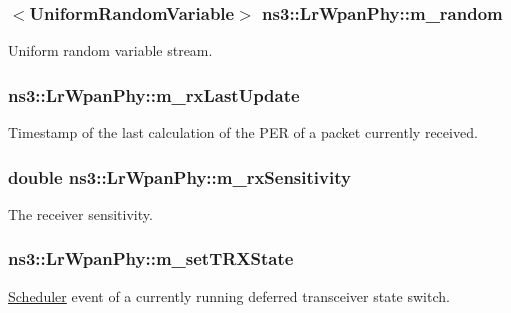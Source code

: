 \subsubsection[{\texorpdfstring{m\+\_\+random}{m_random}}]{$<${\bf Uniform\+Random\+Variable}$>$ ns3\+::\+Lr\+Wpan\+Phy\+::m\+\_\+random\hspace{0.3cm}{\ttfamily [private]}}\hypertarget{classns3_1_1LrWpanPhy_a307453e07b607f6ec19530c1042f1eba}{}\label{classns3_1_1LrWpanPhy_a307453e07b607f6ec19530c1042f1eba}
Uniform random variable stream. 
\subsubsection[{\texorpdfstring{m\+\_\+rx\+Last\+Update}{m_rxLastUpdate}}]{ ns3\+::\+Lr\+Wpan\+Phy\+::m\+\_\+rx\+Last\+Update\hspace{0.3cm}{\ttfamily [private]}}\hypertarget{classns3_1_1LrWpanPhy_ada4772165b76d85314ecbc3c19a404ab}{}\label{classns3_1_1LrWpanPhy_ada4772165b76d85314ecbc3c19a404ab}
Timestamp of the last calculation of the P\+ER of a packet currently received. 
\subsubsection[{\texorpdfstring{m\+\_\+rx\+Sensitivity}{m_rxSensitivity}}]{\setlength{\rightskip}{0pt plus 5cm}double ns3\+::\+Lr\+Wpan\+Phy\+::m\+\_\+rx\+Sensitivity\hspace{0.3cm}{\ttfamily [private]}}\hypertarget{classns3_1_1LrWpanPhy_a8150b66561c973e8d0f9ef77bac739b8}{}\label{classns3_1_1LrWpanPhy_a8150b66561c973e8d0f9ef77bac739b8}
The receiver sensitivity. 
\subsubsection[{\texorpdfstring{m\+\_\+set\+T\+R\+X\+State}{m_setTRXState}}]{ ns3\+::\+Lr\+Wpan\+Phy\+::m\+\_\+set\+T\+R\+X\+State\hspace{0.3cm}{\ttfamily [private]}}\hypertarget{classns3_1_1LrWpanPhy_a0b82e7f96d0225c83489cf3dfb6058ce}{}\label{classns3_1_1LrWpanPhy_a0b82e7f96d0225c83489cf3dfb6058ce}
\hyperlink{classns3_1_1Scheduler}{Scheduler} event of a currently running deferred transceiver state switch. 
